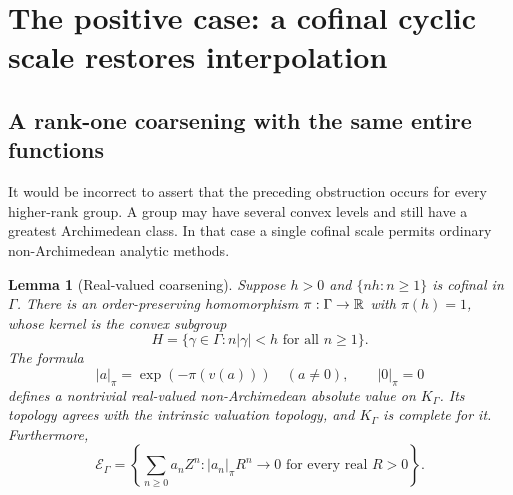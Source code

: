 \documentclass[11pt]{article}
\theoremstyle{plain}
\newtheorem{lemma}[lemma]{Lemma}
\theoremstyle{plain}
\theoremstyle{plain}
\theoremstyle{definition}
\theoremstyle{definition}
\theoremstyle{definition}
\theoremstyle{remark}
\newcommand{\K}{K_\Gamma}\newcommand{\E}{\mathcal E_\Gamma}
\begin{document}
\section{The positive case: a cofinal cyclic scale restores interpolation}
\label{sec:positive}

\subsection{A rank-one coarsening with the same entire functions}
It would be incorrect to assert that the preceding obstruction occurs
for every higher-rank group. A group may have several convex levels
and still have a greatest Archimedean class. In that case a single
cofinal scale permits ordinary non-Archimedean analytic methods.

\begin{lemma}[Real-valued coarsening]\label{lem:coarsening}
Suppose $h>0$ and $\{nh:n\ge1\}$ is cofinal in $\Gamma$. There is an
order-preserving homomorphism $\pi:\Gamma\to\mathbb R$ with $\pi(h)=1$,
whose kernel is the convex subgroup
\[
 H=\{\gamma\in\Gamma:n|\gamma|<h\text{ for all }n\ge1\}.
\]
The formula
\[
 |a|_\pi=\exp(-\pi(v(a)))\quad(a\ne0),\qquad |0|_\pi=0
\]
defines a nontrivial real-valued non-Archimedean absolute value on
$\K$. Its topology agrees with the intrinsic valuation topology,
and $\K$ is complete for it. Furthermore,
\begin{equation}\label{eq:entire-coarsening}
 \E=\left\{\sum_{n\ge0}a_nZ^n:
           |a_n|_\pi R^n\longrightarrow0\text{ for every real }R>0
     \right\}.
\end{equation}
\end{lemma}
\end{document}

